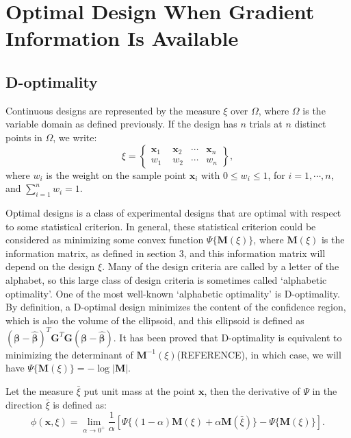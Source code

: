 \documentclass[preprint,12pt]{elsarticle}
\begin{document}
\section{Optimal Design When Gradient Information Is Available}
\subsection{D-optimality}
Continuous designs are represented by the measure $\xi$ over
$\Omega$, where $\Omega$ is the variable domain as defined
previously. If the design has $n$ trials at $n$ distinct points in
$\Omega$, we write:
$$\xi=\left\{\begin{array}{llll} \boldsymbol{x}_1\,\,&\boldsymbol{x}_2&\cdots&\boldsymbol{x}_n\\w_1\,\,&w_2&\cdots&w_n\end{array}\right\},$$
where $w_i$ is the weight on the sample point $\boldsymbol{x}_i$
with $0\leq w_i\leq 1$, for $i=1,\cdots,n$, and $\sum
\limits_{i=1}^n w_i=1$.

Optimal designs is a class of experimental designs that are optimal
with respect to some statistical criterion. In general, these
statistical criterion could be considered as minimizing some convex
function $\Psi\{\boldsymbol{M}(\xi)\}$, where $\boldsymbol{M}(\xi)$
is the information matrix, as defined in section $3$, and this
information matrix will depend on the design $\xi$. Many of the
design criteria are called by a letter of the alphabet, so this
large class of design criteria is sometimes called `alphabetic
optimality'. One of the most well-known `alphabetic optimality' is
D-optimality. By definition, a D-optimal design minimizes the
content of the confidence region, which is also the volume of the
ellipsoid, and this ellipsoid is defined as
$(\boldsymbol{\beta}-\hat{\boldsymbol{\beta}})^T\boldsymbol{G}^T\boldsymbol{G}(\boldsymbol{\beta}-\hat{\boldsymbol{\beta}})$.
It has been proved that D-optimality is equivalent to minimizing the
determinant of $\boldsymbol{M}^{-1}(\xi)$(REFERENCE), in which case,
we will have $\Psi\{\boldsymbol{M}(\xi)\}=-\log|\boldsymbol{M}|$.

Let the measure $\bar{\xi}$ put unit mass at the point
$\boldsymbol{x}$, then the derivative of $\Psi$ in the direction
$\bar{\xi}$ is defined as:
$$\phi(\boldsymbol{x},\xi)=\lim_{\alpha\rightarrow 0^+}\frac{1}{\alpha}\left[\Psi\{(1-\alpha)\boldsymbol{M}(\xi)+\alpha\boldsymbol{M}(\bar{\xi})\}-\Psi\{\boldsymbol{M}(\xi)\}\right].$$
\end{document}

